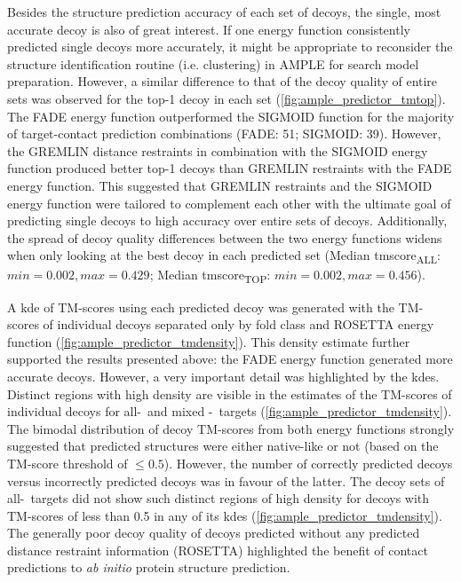 Besides the structure prediction accuracy of each set of decoys, the single, most accurate decoy is also of great interest. If one energy function consistently predicted single decoys more accurately, it might be appropriate to reconsider the structure identification routine (i.e. clustering) in AMPLE for search model preparation. However, a similar difference to that of the decoy quality of entire sets was observed for the top-1 decoy in each set (\cref{fig:ample_predictor_tmtop}). The FADE energy function outperformed the SIGMOID function for the majority of target-contact prediction combinations (FADE: 51; SIGMOID: 39). However, the GREMLIN distance restraints in combination with the SIGMOID energy function produced better top-1 decoys than GREMLIN restraints with the FADE energy function. This suggested that GREMLIN restraints and the SIGMOID energy function were tailored to complement each other with the ultimate goal of predicting single decoys to high accuracy over entire sets of decoys. Additionally, the spread of decoy quality differences between the two energy functions widens when only looking at the best decoy in each predicted set (\textDelta Median \gls{tmscore}\textsubscript{ALL}: $min=0.002, max=0.429$; \textDelta Median \gls{tmscore}\textsubscript{TOP}: $min=0.002, max=0.456$). 

A \gls{kde} of TM-scores using each predicted decoy was generated with the TM-scores of individual decoys separated only by fold class and ROSETTA energy function (\cref{fig:ample_predictor_tmdensity}). This density estimate further supported the results presented above: the FADE energy function generated more accurate decoys. However, a very important detail was highlighted by the \gls{kde}s. Distinct regions with high density are visible in the estimates of the TM-scores of individual decoys for all-\textalpha\ and mixed \textalpha-\textbeta\ targets (\cref{fig:ample_predictor_tmdensity}). The bimodal distribution of decoy TM-scores from both energy functions strongly suggested that predicted structures were either native-like or not (based on the TM-score threshold of $\leq0.5$). However, the number of correctly predicted decoys versus incorrectly predicted decoys was in favour of the latter. The decoy sets of all-\textbeta\ targets did not show such distinct regions of high density for decoys with TM-scores of less than 0.5 in any of its \gls{kde}s (\cref{fig:ample_predictor_tmdensity}). The generally poor decoy quality of decoys predicted without any predicted distance restraint information (ROSETTA) highlighted the benefit of contact predictions to \textit{ab initio} protein structure prediction.

